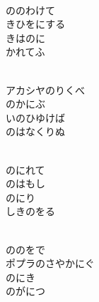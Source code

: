 \documentclass[10pt,b5j]{tarticle} %
\begin{document}
\vspace{1.5em} %
\newcommand{\linespace}{0.5em} %
\newcommand{\blocksize}{0.5\hsize} %
\newcommand{\itemmargin}{6em} %
\begin{enumerate} %
    \setlength{\itemindent}{\itemmargin} %
    \begin{minipage}[c]{\blocksize}
    
        \vspace{\linespace}
        \item~\\
        ののわけて\\
        きひをにする\\
        きはのに\\
        かれてふ
        
        \vspace{\linespace}
        \item~\\
        アカシヤのりくべ\\
        のかにぶ\\
        いのひゆけば\\
        のはなくりぬ
        
        \vspace{\linespace}
        \item~\\
        のにれて\\
        のはもし\\
        のにり\\
        しきのをる
        
        \vspace{\linespace}
        \item~\\
        ののをで\\
        ポプラのさやかにぐ\\
        のにき\\
        のがにつ
        

\end{minipage}
\end{enumerate}
\end{document}
